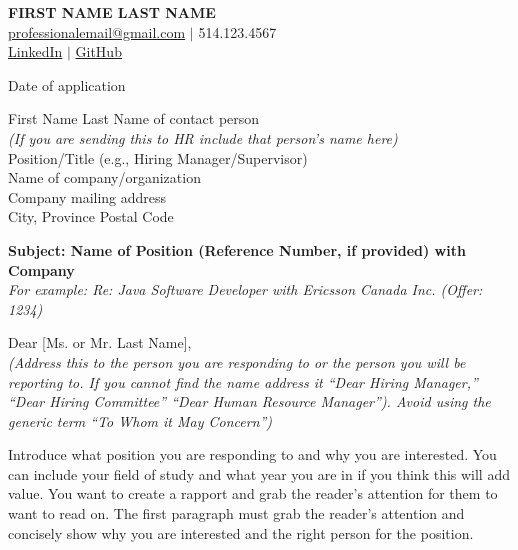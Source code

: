 \documentclass[a4paper,10pt]{article}
\begin{document}
% 
\begin{center} %
    {\LARGE \textbf{FIRST NAME LAST NAME}} \\
    \href{mailto:professionalemail@gmail.com}{professionalemail@gmail.com} $\mid$ 514.123.4567 \\
    \href{https://www.linkedin.com/in/yourlinkedinprofile}{LinkedIn} $\mid$ \href{https://github.com/yourgithub}{GitHub}
\end{center}

\noindent
Date of application

\vspace{1em}

\noindent
First Name Last Name of contact person \\
\textit{(If you are sending this to HR include that person's name here)} \\
Position/Title (e.g., Hiring Manager/Supervisor) \\
Name of company/organization \\
Company mailing address \\
City, Province Postal Code

\vspace{1em}

\noindent
\textbf{Subject: Name of Position (Reference Number, if provided) with Company} \\
\textit{For example: Re: Java Software Developer with Ericsson Canada Inc. (Offer: 1234)}

\vspace{1em}

\noindent
Dear [Ms. or Mr. Last Name], \\
\textit{(Address this to the person you are responding to or the 
person you will be reporting to. If you cannot find the name 
address it “Dear Hiring Manager,” “Dear Hiring Committee” 
“Dear Human Resource Manager”). Avoid using the generic term “To Whom it May Concern”)}

\vspace{1em}

\noindent
Introduce what position you are responding to and 
why you are interested. You can include your field of 
study and what year you are in if you think this will add value. 
You want to create a rapport and grab the reader’s attention for 
them to want to read on. The first paragraph must grab the reader’s 
attention and concisely show why you are interested and the right person for the position.

\vspace{1em}
\end{document}
